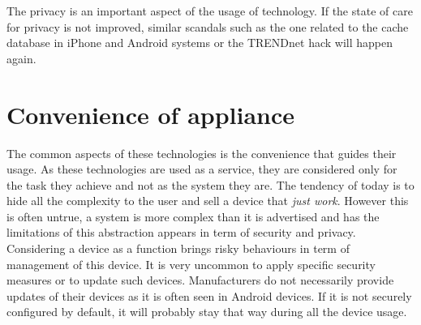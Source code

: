 The privacy is an important aspect of the usage of technology.
If the state of care for privacy is not improved, similar scandals such as the one related to the cache database in iPhone and Android systems or the TRENDnet hack will happen again.

\section{Convenience of appliance}

The common aspects of these technologies is the convenience that guides their usage.
As these technologies are used as a service, they are considered only for the task they achieve and not as the system they are.
The tendency of today is to hide all the complexity to the user and sell a device that \emph{just work}.
However this is often untrue, a system is more complex than it is advertised and has the limitations of this abstraction appears in term of security and privacy.\\

Considering a device as a function brings risky behaviours in term of management of this device.
It is very uncommon to apply specific security measures or to update such devices.
Manufacturers do not necessarily provide updates of their devices as it is often seen in Android devices.
If it is not securely configured by default, it will probably stay that way during all the device usage.


